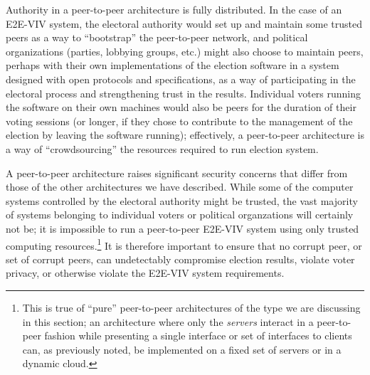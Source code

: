 Authority in a peer-to-peer architecture is fully distributed. In the
case of an E2E-VIV system, the electoral authority would set up and
maintain some trusted peers as a way to ``bootstrap'' the peer-to-peer
network, and political organizations (parties, lobbying groups, etc.)
might also choose to maintain peers, perhaps with their own
implementations of the election software in a system designed with
open protocols and specifications, as a way of participating in the
electoral process and strengthening trust in the results. Individual
voters running the software on their own machines would also be peers
for the duration of their voting sessions (or longer, if they chose to
contribute to the management of the election by leaving the software
running); effectively, a peer-to-peer architecture is a way of
``crowdsourcing'' the resources required to run election system. 

A peer-to-peer architecture raises significant security concerns that
differ from those of the other architectures we have described. While
some of the computer systems controlled by the electoral authority
might be trusted, the vast majority of systems belonging to individual
voters or political organzations will certainly not be; it is
impossible to run a peer-to-peer E2E-VIV system using only trusted
computing resources.\footnote{This is true of ``pure'' peer-to-peer
  architectures of the type we are discussing in this section; an
  architecture where only the \emph{servers} interact in a
  peer-to-peer fashion while presenting a single interface or set of
  interfaces to clients can, as previously noted, be implemented on a
  fixed set of servers or in a dynamic cloud.} It is therefore
important to ensure that no corrupt peer, or set of corrupt peers, can
undetectably compromise election results, violate voter privacy, or
otherwise violate the E2E-VIV system requirements.

